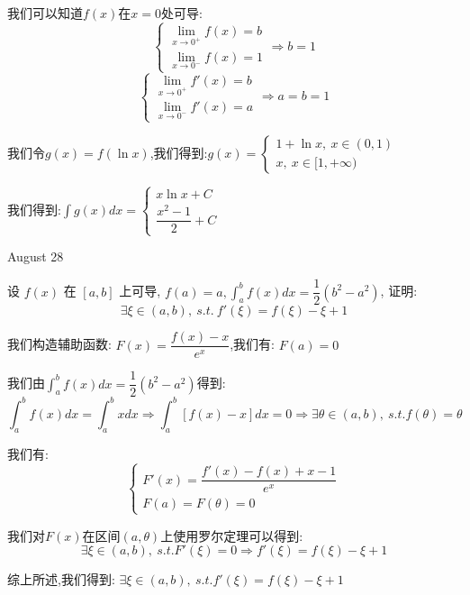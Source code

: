 \begin{solution}

	我们可以知道$f(x)$在$x=0$处可导:
	$$\left\lbrace
	\begin{array}{l}
		\lim\limits_{x\to 0^{+}}f(x)=b\\
		\lim\limits_{x\to 0^{-}}f(x)=1
	\end{array}
	\right. \Rightarrow b=1$$
	$$\left\lbrace
	\begin{array}{l}
		\lim\limits_{x\to 0^{+}}f'(x)=b\\
		\lim\limits_{x\to 0^{-}}f'(x)=a
	\end{array}
	\right.\Rightarrow a=b=1$$
	
	我们令$g(x)=f(\ln x)$,我们得到:$g(x)=\left\lbrace
	\begin{array}{l}
		1+\ln x,\ x\in(0,1)\\
		x,\ x\in[1,+\infty)
	\end{array}
	\right. $
	
	我们得到:$\int g(x)dx=\left\lbrace
	\begin{array}{l}
		x\ln x+C\\
		\dfrac{x^2-1}{2}+C
	\end{array}
	\right. $
\end{solution}


\textcolor{purplea}{August 28}

\begin{example}[][Exam: 34.4.13]
	设 $f(x)$ 在 $[a,b]$ 上可导, $f(a)=a, \int_{a}^{b}f(x)dx=\dfrac{1}{2}(b^2-a^2)$, 证明:
	$$\exists\xi\in(a,b),\ s.t.\ f'(\xi)=f(\xi)-\xi+1$$
\end{example} 

\begin{solution}

	我们构造辅助函数:  $F(x)=\dfrac{f(x)-x}{e^x}$,我们有:  $F(a)=0$
	
	我们由$\int_{a}^{b}f(x)dx=\dfrac{1}{2}(b^2-a^2)$得到:  
	$$\int_{a}^{b}f(x)dx=\int_{a}^{b}xdx\Rightarrow \int_{a}^{b}\left[ f(x)-x\right] dx=0\Rightarrow \exists \theta\in(a,b),\ s.t. f(\theta)=\theta$$
	
	我们有:  
	$$\left\lbrace
	\begin{array}{l}
		F'(x)=\dfrac{f'(x)-f(x)+x-1}{e^x}\\
		F(a)=F(\theta)=0
	\end{array}
	\right. $$
	
	我们对$F(x)$在区间$(a,\theta)$上使用罗尔定理可以得到:  
	$$\exists\xi\in(a,b),\ s.t. F'(\xi)=0\Rightarrow f'(\xi)=f(\xi)-\xi+1$$
	
	综上所述,我们得到:  $\exists\xi\in(a,b),\ s.t. f'(\xi)=f(\xi)-\xi+1$
\end{solution}

